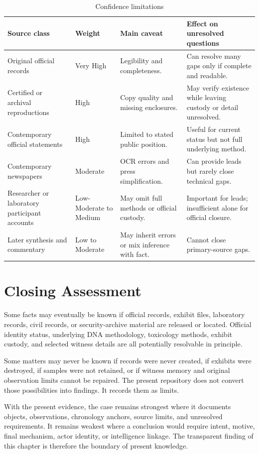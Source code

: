 \begin{table}[htbp]
\centering
\caption{Confidence limitations}
\label{tab:chapter11-confidence-limitations}
\scriptsize
\setlength{\tabcolsep}{2pt}
\renewcommand{\arraystretch}{1.12}
\begin{tabularx}{\textwidth}{>{\raggedright\arraybackslash}p{}>{\raggedright\arraybackslash}p{}>{\raggedright\arraybackslash}p{}>{\raggedright\arraybackslash}X}
\toprule
Source class & Weight & Main caveat & Effect on unresolved questions \\
\midrule
Original official records & Very High & Legibility and completeness. & Can resolve many gaps only if complete and readable. \\
Certified or archival reproductions & High & Copy quality and missing enclosures. & May verify existence while leaving custody or detail unresolved. \\
Contemporary official statements & High & Limited to stated public position. & Useful for current status but not full underlying method. \\
Contemporary newspapers & Moderate & OCR errors and press simplification. & Can provide leads but rarely close technical gaps. \\
Researcher or laboratory participant accounts & Low-Moderate to Medium & May omit full methods or official custody. & Important for leads; insufficient alone for official closure. \\
Later synthesis and commentary & Low to Moderate & May inherit errors or mix inference with fact. & Cannot close primary-source gaps. \\
\bottomrule
\end{tabularx}
\end{table}

\section{Closing Assessment}

Some facts may eventually be known if official records, exhibit files, laboratory records, civil records, or security-archive material are released or located. Official identity status, underlying DNA methodology, toxicology methods, exhibit custody, and selected witness details are all potentially resolvable in principle.

Some matters may never be known if records were never created, if exhibits were destroyed, if samples were not retained, or if witness memory and original observation limits cannot be repaired. The present repository does not convert those possibilities into findings. It records them as limits.

With the present evidence, the case remains strongest where it documents objects, observations, chronology anchors, source limits, and unresolved requirements. It remains weakest where a conclusion would require intent, motive, final mechanism, actor identity, or intelligence linkage. The transparent finding of this chapter is therefore the boundary of present knowledge.
